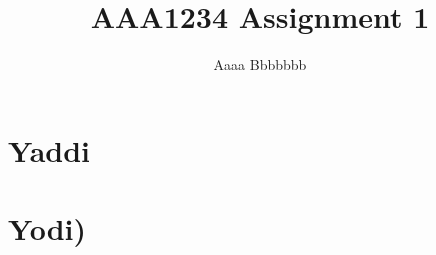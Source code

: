 \documentclass{article}
\begin{document}
\title{AAA1234 Assignment 1}
\author{Aaaa Bbbbbbb}

\maketitle

\section{Yaddi}

\section{Yodi)}
\end{document}
